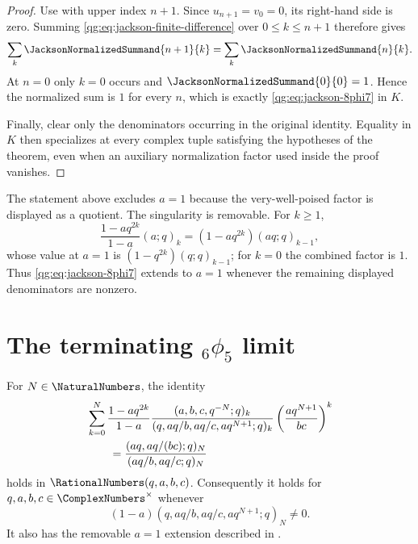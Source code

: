 \begin{proof}
Use  with upper index $n+1$.  Since
$u_{n+1}=v_0=0$, its right-hand side is zero.  Summing
\eqref{qg:eq:jackson-finite-difference} over $0\le k\le n+1$ therefore gives
\[
 \sum_k\JacksonNormalizedSummand{n+1}{k}
 =\sum_k\JacksonNormalizedSummand{n}{k}.
\]
At $n=0$ only $k=0$ occurs and
$\JacksonNormalizedSummand{0}{0}=1$.  Hence the normalized sum is $1$
for every $n$, which is exactly \eqref{qg:eq:jackson-8phi7} in $K$.

Finally, clear only the denominators occurring in the original identity.
Equality in $K$ then specializes at every complex tuple satisfying the
hypotheses of the theorem, even when an auxiliary normalization factor used
inside the proof vanishes.
\end{proof}

\begin{remark}[The removable value $a=1$]
\label{qg:rem:jackson-a-one}
The statement above excludes $a=1$ because the very-well-poised factor is
displayed as a quotient.  The singularity is removable.  For $k\ge1$,
\[
 \frac{1-aq^{2k}}{1-a}(a;q)_k
 =(1-aq^{2k})(aq;q)_{k-1},
\]
whose value at $a=1$ is $(1-q^{2k})(q;q)_{k-1}$; for $k=0$ the combined
factor is $1$.  Thus \eqref{qg:eq:jackson-8phi7} extends to $a=1$ whenever
the remaining displayed denominators are nonzero.
\end{remark}

\section{The terminating \texorpdfstring{${}_6\phi_5$}{6phi5} limit}
\label{qg:sec:terminating-6phi5}

\begin{corollary}
\label{qg:cor-jackson-6phi5}
For $N\in\NaturalNumbers$, the identity
\begin{align}
&\sum_{k=0}^{N}
 \frac{1-aq^{2k}}{1-a}
 \frac{(a,b,c,q^{-N};q)_k}
 {(q,aq/b,aq/c,aq^{N+1};q)_k}
 \left(\frac{aq^{N+1}}{bc}\right)^k
 \notag\\
&\qquad=
 \frac{(aq,aq/(bc);q)_N}{(aq/b,aq/c;q)_N}
\label{qg:eq:terminating-6phi5}
\end{align}
holds in $\RationalNumbers(q,a,b,c)$.  Consequently it holds for
$q,a,b,c\in\ComplexNumbers^\times$ whenever
\[
 (1-a)(q,aq/b,aq/c,aq^{N+1};q)_N\ne0.
\]
It also has the removable $a=1$ extension described in
.
\end{corollary}

